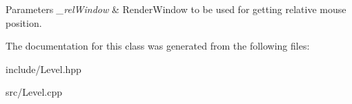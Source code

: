 \begin{DoxyParams}{Parameters}
{\em \+\_\+rel\+Window} & Render\+Window to be used for getting relative mouse position. \\
\hline
\end{DoxyParams}


The documentation for this class was generated from the following files\+:\begin{DoxyCompactItemize}
\item 
include/Level.\+hpp\item 
src/Level.\+cpp\end{DoxyCompactItemize}
